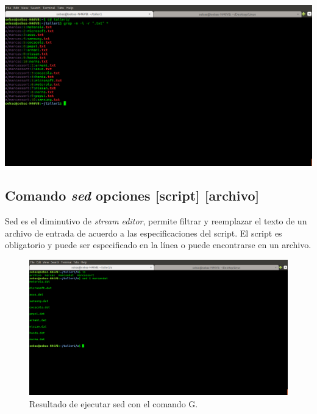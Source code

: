 \documentclass{article}
\begin{document}
\begin{itemize}
        \begin{minipage}{\linewidth}
            \centering
            \includegraphics[width=\textwidth]{grep-r.png}
        \end{minipage}
\end{itemize}
\subsection{Comando \emph{sed} opciones [script] [archivo]}
Sed es el diminutivo de \emph{stream editor}, permite filtrar y reemplazar el texto de un archivo de entrada de acuerdo a las especificaciones del script. El script es obligatorio y puede ser especificado en la línea o puede encontrarse en un archivo.
\begin{figure}[h]
    \centering
    \includegraphics[width=\textwidth]{sed.png}
    \caption{Resultado de ejecutar sed con el comando G.}
\end{figure}
\end{document}
